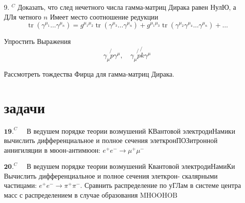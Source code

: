 \documentclass[a4paper,12pt]{article} %
\begin{document}
\begin{task}

9. $^{C}$ Доказать, что след нечетного числа гамма-матриц Дирака равен НулЮ, а ДЛя четного $n$ Имеет место соотношение редукции
$$
\operatorname{tr}\left(\gamma^{\mu_{1}} \ldots \gamma^{\mu_{n}}\right)=g^{\mu_{1} \mu_{2}} \operatorname{tr}\left(\gamma^{\mu_{3}} \ldots \gamma^{\mu_{n}}\right)+g^{\mu_{1} \mu_{3}} \operatorname{tr}\left(\gamma^{\mu_{2}} \gamma^{\mu_{4}} \ldots \gamma^{\mu_{n}}\right)+\ldots
$$


\end{task}



\begin{task}

Упростить Выражения
$$
\gamma_{\mu} \not{p} \gamma^{\mu}, \quad \gamma_{\mu} \not{p} \not{k} \gamma^{\mu}
$$


\end{task}



\begin{task}

Рассмотреть тождества Фирца для гамма-матриц Дирака.


\end{task}


\section{задачи}


\begin{task}

$\mathbf{1 9 .}^{C} \quad$ В ведушем порядке теории возмушений КВантовой электродиНамики вычислить дифференциальное и полное сечения элеткронПОЗитронной аннигиляции в мюон-антимюон: $e^{+} e^{-} \rightarrow \mu^{+} \mu^{-}$


\end{task}



\begin{task}

$\mathbf{2 0 .}^{C} \quad$ В ведушем порядке теории возмушений Квантовой электродиНамиКи Вычислить дифференциальное и полное сечения элеткрон-
скалярными частицами: $e^{+} e^{-} \rightarrow \pi^{+} \pi^{-} .$ Сравнить распределение по уГЛам в системе центра масс с распределением в случае образования
$\mathrm{M} \mathrm{HOOHOB}$


\end{task}
\end{document}
